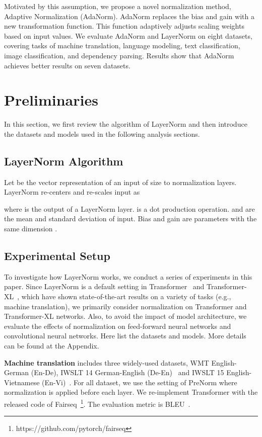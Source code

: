 \documentclass{article}
\begin{document}
Motivated by this assumption, we propose a novel normalization method,  Adaptive Normalization (AdaNorm). AdaNorm replaces the bias and gain with a new transformation function. This function adaptively adjusts scaling weights based on input values. 
We evaluate AdaNorm and LayerNorm on eight datasets, covering tasks of machine translation, language modeling, text classification, image classification, and dependency parsing.  Results show that AdaNorm achieves better results on seven datasets. 



\section{Preliminaries}
In this section, we first review the algorithm of LayerNorm and then introduce the datasets and models used in the following analysis sections. 

\subsection{LayerNorm Algorithm}
Let  be the vector representation of an input of size  to normalization layers. LayerNorm re-centers and re-scales input  as

where  is the output of a LayerNorm layer.  is a dot production operation.  and  are the mean and standard deviation of input. 
Bias  and gain  are parameters with the same dimension .  

\subsection{Experimental Setup}

To investigate how LayerNorm works, we conduct a series of experiments in this paper. 
Since LayerNorm is a default setting in Transformer~\citep{DBLP:conf/nips/VaswaniSPUJGKP17} and Transformer-XL~\citep{dai2019transformer}, which have shown state-of-the-art results on a variety of tasks (e.g., machine translation), we primarily consider normalization on Transformer and Transformer-XL networks. 
Also, 
to avoid the impact of model architecture, 
we evaluate the effects of normalization on feed-forward neural networks and convolutional neural networks. Here list the datasets and models. More details can be found at the Appendix.

\textbf{Machine translation} includes three widely-used datasets,  WMT English-German (En-De), IWSLT 14 German-English (De-En)~\citep{cettolo2014iwslt} and IWSLT 15 English-Vietnamese (En-Vi)~\citep{cettolo2015iwslt}.  For all dataset, 
we use the setting of PreNorm where normalization is applied before each layer.   We re-implement Transformer with the released code of Fairseq~\citep{ott2019fairseq}\footnote{https://github.com/pytorch/fairseq}. 
The evaluation metric is BLEU~\citep{DBLP:conf/acl/PapineniRWZ02}. 
  
\end{document}
